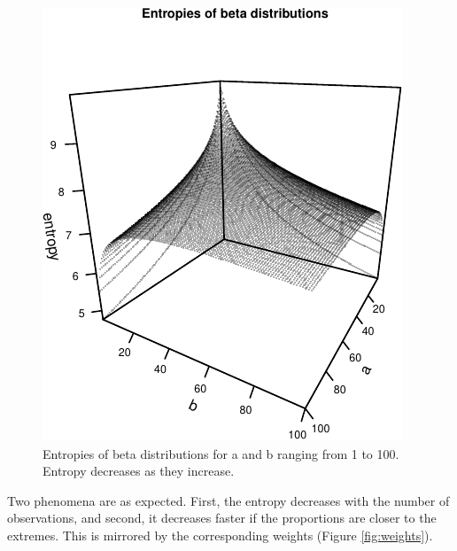 \documentclass[
  10pt,
  dvipsnames,enabledeprecatedfontcommands]{scrartcl}
\begin{document}
\begin{figure}[H]

\begin{center}\includegraphics[width=1\linewidth]{impreciseEpistemicFINAL_files/figure-latex/fig:entropies-1} \end{center}
\caption{Entropies of beta distributions for a and b ranging from 1 to 100. Entropy decreases as they increase.}
\label{fig:entropies}
\end{figure}

Two phenomena are as expected. First, the entropy decreases with the
number of observations, and second, it decreases faster if the
proportions are closer to the extremes. This is mirrored by the
corresponding weights (Figure \ref{fig:weights}).
\end{document}
